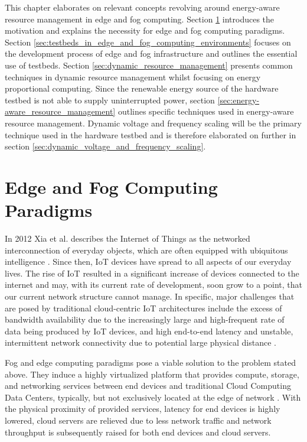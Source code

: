 This chapter elaborates on relevant concepts revolving around energy-aware
resource management in edge and fog computing. Section
\ref{sec:edge_and_fog_computing_paradigms} introduces the motivation and
explains the necessity for edge and fog computing paradigms. Section
\ref{sec:testbeds_in_edge_and_fog_computing_environments} focuses on the
development process of edge and fog infrastructure and outlines the essential
use of testbeds. Section \ref{sec:dynamic_resource_management} presents common
techniques in dynamic resource management whilst focusing on energy proportional
computing. Since the renewable energy source of the hardware testbed is not able
to supply uninterrupted power, section
\ref{sec:energy-aware_resource_management} outlines specific techniques used in
energy-aware resource management. Dynamic voltage and frequency scaling will be
the primary technique used in the hardware testbed and is therefore elaborated
on further in section \ref{sec:dynamic_voltage_and_frequency_scaling}.

\section{Edge and Fog Computing Paradigms}
\label{sec:edge_and_fog_computing_paradigms}

In 2012 Xia et al. describes the Internet of Things as the networked
interconnection of everyday objects, which are often equipped with ubiquitous
intelligence \cite{xia2012}. Since then, IoT devices have spread to all aspects
of our everyday lives. The rise of IoT resulted in a significant increase of
devices connected to the internet and may, with its current rate of development,
soon grow to a point, that our current network structure cannot manage. In
specific, major challenges that are posed by traditional cloud-centric IoT
architectures include the excess of bandwidth availability due to the
increasingly large and high-frequent rate of data being produced by IoT devices,
and high end-to-end latency and unstable, intermittent network connectivity due
to potential large physical distance \cite{buyya2019}.

Fog and edge computing paradigms pose a viable solution to the problem stated
above. They induce a highly virtualized platform that provides compute, storage,
and networking services between end devices and traditional Cloud Computing Data
Centers, typically, but not exclusively located at the edge of network
\cite{bonomi2012}. With the physical proximity of provided services, latency for
end devices is highly lowered, cloud servers are relieved due to less network
traffic and network throughput is subsequently raised for both end devices and
cloud servers.

